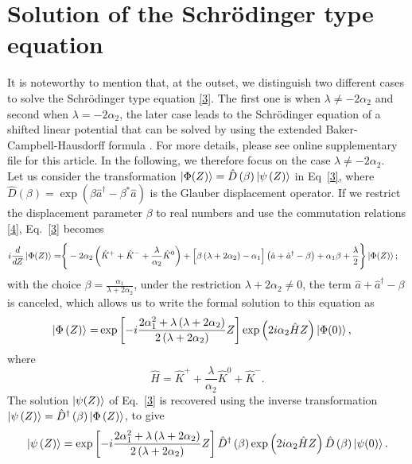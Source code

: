 \documentclass[12pt]{article}
\numberwithin{equation}{section}
\begin{document}
\section{Solution of the Schrödinger type equation}
It is noteworthy to mention that, at the outset, we distinguish two different cases to solve the Schrödinger type equation \eqref{3}. The first one is when $\lambda \neq -2\alpha_2$ and second when $\lambda = -2\alpha_2$, the later case leads to the Schrödinger equation of a shifted linear potential that can be solved by using the extended Baker-Campbell-Hausdorff formula \cite{extbchf}. For more details, please see online supplementary file for this article. In the following, we therefore focus on the case $\lambda \neq -2\alpha_2$.\\
Let us consider the transformation $\ket{\Phi(Z)}=\hat{D}\left(\beta\right) \ket{\psi\left(Z\right)}$ in Eq~\eqref{3}, where $\hat{D}(\beta)=\exp\left(\beta \hat{a}^\dagger-\beta^{*}\hat{a}\right)$ is the Glauber displacement operator\cite{24,25}. If we restrict the displacement parameter $\beta$ to real numbers and use the commutation relations \eqref{4}, Eq.~\eqref{3} becomes
\begin{align} \label{5}
i \frac{d}{dZ} \ket{\Phi(Z)}=& \Bigg\lbrace-2 \alpha_{2} \left( \hat{K}^{+} + \hat{K}^{-} + \frac{\lambda}{\alpha_{2}} \hat{K}^{0} \right) + \Big[\beta\left(\lambda + 2 \alpha_{2}\right)-\alpha_{1}\Big] \left(\hat{a} + \hat{a}^{\dagger}-\beta\right)  + \alpha_{1}\beta + \frac{\lambda}{2}\Bigg\rbrace \ket{\Phi(Z)};
\end{align}
with the choice $\beta=\frac{\alpha_{1}}{\lambda + 2 \alpha_{2}}$, under the restriction $\lambda+2\alpha_2\neq0$, the term $\hat{a} + \hat{a}^{\dagger}-\beta$ is canceled, which allows us to write the formal solution to this equation as
\begin{align} \label{6}
\ket{\Phi\left(Z\right)}=&\exp\left[-i \frac{2 \alpha^2_{1} + \lambda \left(\lambda  + 2 \alpha_{2} \right)}{2 \left(\lambda + 2 \alpha_2 \right)} Z\right]  \exp\left( 2 i \alpha_{2} \hat{H} Z \right) \ket{\Phi(0)},
\end{align}
where
\begin{equation}\label{7}
\hat{H}= \hat{K}^{+} +  \frac{\lambda}{\alpha_{2}} \hat{K}^{0} + \hat{K}^{-}  .
\end{equation}
The solution $\ket{\psi(Z)}$ of Eq.~\eqref{3} is recovered using the inverse transformation $\ket{\psi\left(Z\right)}=\hat{D}^{\dagger}\left(\beta\right) \ket{\Phi\left(Z\right)}$, to give
\begin{equation} \label{8}
\ket{\psi\left(Z\right)}= \exp\left[-i \frac{2 \alpha^2_{1} + \lambda \left(\lambda  + 2 \alpha_{2} \right)}{2 \left(\lambda + 2 \alpha_2 \right)} Z\right] \hat{D}^{\dagger}\left(\beta\right)  \exp\left( 2 i \alpha_{2} \hat{H} Z \right) \hat{D}\left(\beta\right) \ket{\psi(0)}.
\end{equation}
\end{document}

